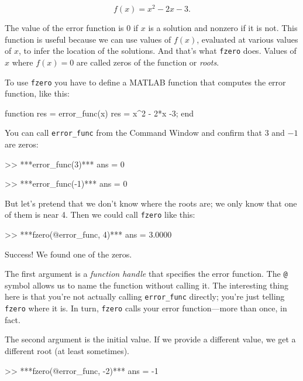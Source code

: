 \begin{equation*}
f(x) = x^2 - 2x -3.
\end{equation*}

The value of the error function is 0 if $x$ is a solution and nonzero if it is not.
This function is useful because we can use values of $f(x)$, evaluated at various values of $x$, to infer the location of the solutions.  And that's what \lstinline{fzero} does.
Values of $x$ where $f(x) = 0$ are called zeros of the function or \emph{roots}.


To use \lstinline{fzero} you have to define a MATLAB function that computes the error function, like this:

\begin{code}
function res = error_func(x)
    res = x^2 - 2*x -3;
end
\end{code}

You can call \lstinline{error_func} from the Command Window and confirm that $3$ and $-1$ are zeros:

\begin{code}
>> ***error_func(3)***
ans = 0

>> ***error_func(-1)***
ans = 0
\end{code}

But let's pretend that we don't know where the roots are; we only know that one of them is near 4.  Then we could call \lstinline{fzero} like this:

\begin{code}
>> ***fzero(@error_func, 4)***
ans = 3.0000
\end{code}

Success!  We found one of the zeros.

The first argument is a {\em function handle} that specifies
the error function.  The \lstinline{@} symbol allows us to name the
function without calling it.  The interesting thing here is
that you're not actually calling \lstinline{error_func} directly;
you're just telling \lstinline{fzero} where it is.  In turn, \lstinline{fzero}
calls your error function---more than once, in fact.


The second argument is the initial value.  If we provide a different
value, we get a different root (at least sometimes).

\begin{code}
>> ***fzero(@error_func, -2)***
ans = -1
\end{code}

